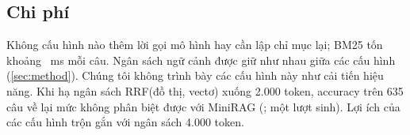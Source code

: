 \subsection{Chi phí}\label{sec:efficiency}
Không cấu hình nào thêm lời gọi mô hình hay cần lập chỉ mục lại; BM25 tốn khoảng \bmMs{}~ms mỗi câu.
Ngân sách ngữ cảnh được giữ như nhau giữa các cấu hình (\cref{sec:method}).
Chúng tôi không trình bày các cấu hình này như cải tiến hiệu năng.
Khi hạ ngân sách RRF(đồ thị, vectơ) xuống 2.000 token, accuracy trên 635 câu về lại mức không phân biệt được với MiniRAG (\budgetTwoK; một lượt sinh). Lợi ích của các cấu hình trộn gắn với ngân sách 4.000 token.
